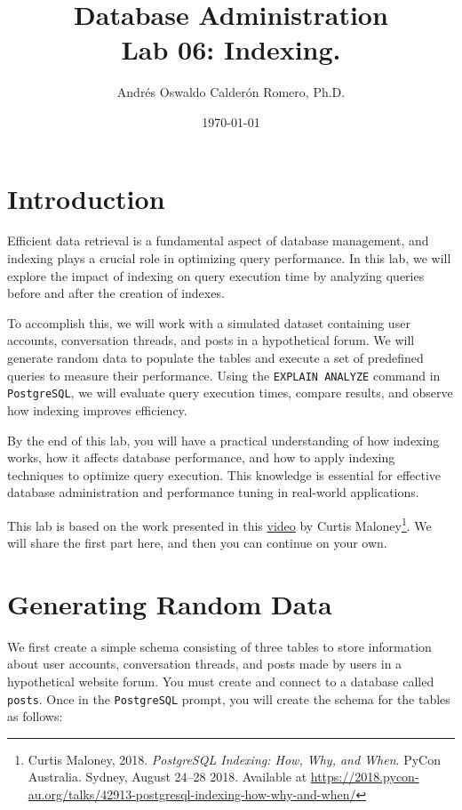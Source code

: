 \documentclass{article}
\title{Database Administration \\ Lab 06: Indexing.}
\author{Andrés Oswaldo Calderón Romero, Ph.D.}
\date{\today}
\begin{document}
\maketitle

\section{Introduction}

Efficient data retrieval is a fundamental aspect of database management, and indexing plays a crucial role in optimizing query performance. In this lab, we will explore the impact of indexing on query execution time by analyzing queries before and after the creation of indexes.

To accomplish this, we will work with a simulated dataset containing user accounts, conversation threads, and posts in a hypothetical forum. We will generate random data to populate the tables and execute a set of predefined queries to measure their performance. Using the \texttt{EXPLAIN ANALYZE} command in \texttt{PostgreSQL}, we will evaluate query execution times, compare results, and observe how indexing improves efficiency.

By the end of this lab, you will have a practical understanding of how indexing works, how it affects database performance, and how to apply indexing techniques to optimize query execution. This knowledge is essential for effective database administration and performance tuning in real-world applications.

This lab is based on the work presented in this \href{https://youtu.be/clrtT_4WBAw?si=Q5Rmt7YVsykuS715}{video} by Curtis Maloney\footnote{Curtis Maloney, 2018. \textit{PostgreSQL Indexing: How, Why, and When}. PyCon Australia. Sydney, August 24–28 2018. Available at \url{https://2018.pycon-au.org/talks/42913-postgresql-indexing-how-why-and-when/}}. We will share the first part here, and then you can continue on your own.

\section{Generating Random Data}
We first create a simple schema consisting of three tables to store information about user accounts, conversation threads, and posts made by users in a hypothetical website forum. You must create and connect to a database called \texttt{posts}. Once in the \texttt{PostgreSQL} prompt, you will create the schema for the tables as follows:
\end{document}
